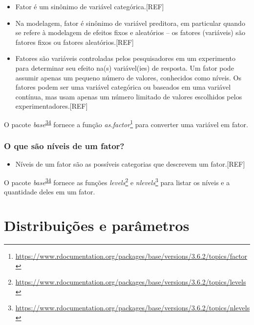 \documentclass[
  a4paper,
]{book}
\providecommand{\tightlist}{%
  \setlength{\itemsep}{0pt}\setlength{\parskip}{0pt}}
\renewcommand{\href}[2]{#2\footnote{\url{#1}}}
\newenvironment{infobox}[1]
  {
  \begin{itemize}
  \renewcommand{\labelitemi}{
    \raisebox{-.7\height}[0pt][0pt]{
      {\setkeys{Gin}{width=3em,keepaspectratio}
        \texttt{[image: \#1]}}
    }
  }
  \setlength{\fboxsep}{1em}
  \begin{blackbox}
  \item
  }
  {
  \end{blackbox}
  \end{itemize}
  }
\begin{document}
\begin{itemize}
\item
  Fator é um sinônimo de variável categórica.{[}REF{]}
\item
  Na modelagem, fator é sinônimo de variável preditora, em particular quando se refere à modelagem de efeitos fixos e aleatórios -- os fatores (variáveis) são fatores fixos ou fatores aleatórios.{[}REF{]}
\item
  Fatores são variáveis controladas pelos pesquisadores em um experimento para determinar seu efeito na(s) variável(ies) de resposta. Um fator pode assumir apenas um pequeno número de valores, conhecidos como níveis. Os fatores podem ser uma variável categórica ou baseados em uma variável contínua, mas usam apenas um número limitado de valores escolhidos pelos experimentadores.{[}REF{]}
\end{itemize}

\begin{infobox}{images/Rlogo}
O pacote \emph{base}\textsuperscript{\protect\hyperlink{ref-base-2}{34}} fornece a função \href{https://www.rdocumentation.org/packages/base/versions/3.6.2/topics/factor}{\emph{as.factor}} para converter uma variável em fator.

\end{infobox}

\hypertarget{o-que-suxe3o-nuxedveis-de-um-fator}{%
\subsection{O que são níveis de um fator?}\label{o-que-suxe3o-nuxedveis-de-um-fator}}

\begin{itemize}
\tightlist
\item
  Níveis de um fator são as possíveis categorias que descrevem um fator.{[}REF{]}
\end{itemize}

\begin{infobox}{images/Rlogo}
O pacote \emph{base}\textsuperscript{\protect\hyperlink{ref-base-2}{34}} fornece as funções \href{https://www.rdocumentation.org/packages/base/versions/3.6.2/topics/levels}{\emph{levels}} e \href{https://www.rdocumentation.org/packages/base/versions/3.6.2/topics/nlevels}{\emph{nlevels}} para listar os níveis e a quantidade deles em um fator.

\end{infobox}

\hypertarget{distribuicoes-parametros}{%
\chapter{\texorpdfstring{\textbf{Distribuições e parâmetros}}{Distribuições e parâmetros}}\label{distribuicoes-parametros}}
\end{document}
